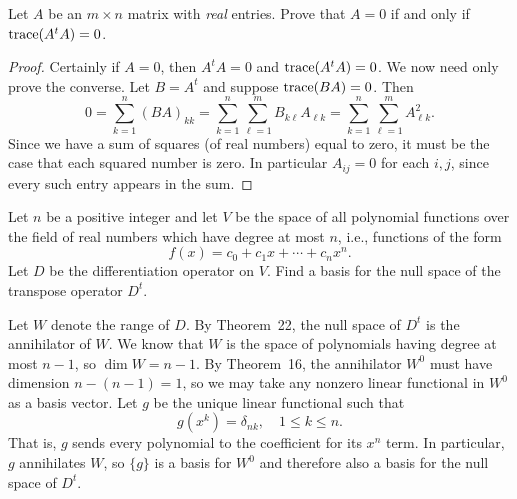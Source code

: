  Let $A$ be an $m\times n$ matrix with {\em real}
entries. Prove that $A = 0$ if and only if $\operatorname{trace}(A^tA) = 0$.
\begin{proof}
  Certainly if $A = 0$, then $A^tA = 0$ and $\operatorname{trace}(A^tA) = 0$. We now
  need only prove the converse. Let $B = A^t$ and suppose
  $\operatorname{trace}(BA) = 0$. Then
  \begin{equation*}
    0
    = \sum_{k=1}^n(BA)_{kk}
    = \sum_{k=1}^n\sum_{\ell=1}^mB_{k\ell}A_{\ell k}
    = \sum_{k=1}^n\sum_{\ell=1}^mA_{\ell k}^2.
  \end{equation*}
  Since we have a sum of squares (of real numbers) equal to zero, it
  must be the case that each squared number is zero. In particular
  $A_{ij} = 0$ for each $i,j$, since every such entry appears in the
  sum.
\end{proof}

 Let $n$ be a positive integer and let $V$ be the space of
all polynomial functions over the field of real numbers which have
degree at most $n$, i.e., functions of the form
\begin{equation*}
  f(x) = c_0 + c_1x + \cdots + c_nx^n.
\end{equation*}
Let $D$ be the differentiation operator on $V$. Find a basis for the
null space of the transpose operator $D^t$.
\begin{solution}
  Let $W$ denote the range of $D$. By Theorem~22, the null space of
  $D^t$ is the annihilator of $W$. We know that $W$ is the space of
  polynomials having degree at most $n - 1$, so $\dim W = n - 1$. By
  Theorem~16, the annihilator $W^0$ must have dimension
  $n - (n - 1) = 1$, so we may take any nonzero linear functional in
  $W^0$ as a basis vector. Let $g$ be the unique linear functional
  such that
  \begin{equation*}
    g(x^k) = \delta_{nk}, \quad 1\leq k\leq n.
  \end{equation*}
  That is, $g$ sends every polynomial to the coefficient for its $x^n$
  term. In particular, $g$ annihilates $W$, so $\{g\}$ is a basis for
  $W^0$ and therefore also a basis for the null space of $D^t$.
\end{solution}


